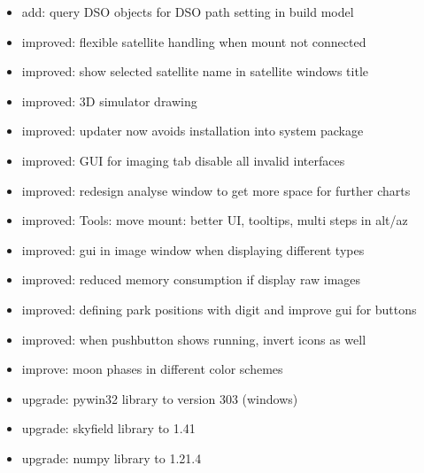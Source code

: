 \documentclass[a4paper,10pt,english]{sphinxmanual}
\begin{document}
\begin{itemize}
\item {} 
\sphinxAtStartPar
add: query DSO objects for DSO path setting in build model

\item {} 
\sphinxAtStartPar
improved: flexible satellite handling when mount not connected

\item {} 
\sphinxAtStartPar
improved: show selected satellite name in satellite windows title

\item {} 
\sphinxAtStartPar
improved: 3D simulator drawing

\item {} 
\sphinxAtStartPar
improved: updater now avoids installation into system package

\item {} 
\sphinxAtStartPar
improved: GUI for imaging tab \sphinxhyphen{} disable all invalid interfaces

\item {} 
\sphinxAtStartPar
improved: redesign analyse window to get more space for further charts

\item {} 
\sphinxAtStartPar
improved: Tools: move mount: better UI, tooltips, multi steps in alt/az

\item {} 
\sphinxAtStartPar
improved: gui in image window when displaying different types

\item {} 
\sphinxAtStartPar
improved: reduced memory consumption if display raw images

\item {} 
\sphinxAtStartPar
improved: defining park positions with digit and improve gui for buttons

\item {} 
\sphinxAtStartPar
improved: when pushbutton shows running, invert icons as well

\item {} 
\sphinxAtStartPar
improve: moon phases in different color schemes

\item {} 
\sphinxAtStartPar
upgrade: pywin32 library to version 303 (windows)

\item {} 
\sphinxAtStartPar
upgrade: skyfield library to 1.41

\item {} 
\sphinxAtStartPar
upgrade: numpy library to 1.21.4


\end{itemize}
\end{document}
